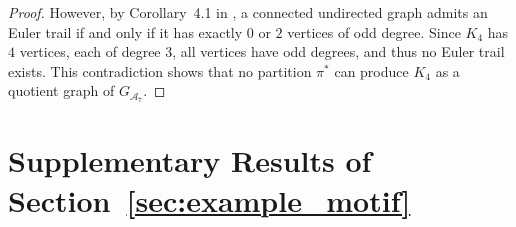 \documentclass[sn-mathphys, natbib=false]{sn-jnl}
\newcommand{\libref}[2]{\href{#2}{\texttt{#1}}}
\def\package{\libref{u-stats}{https://github.com/zrq1706/U-Statistics-Python}}
\theoremstyle{plain}
\theoremstyle{definition}
\def\Einsum{\textsc{Einsum}}
\newcommand{\completegraphp}[1]{K_{#1}}
\newcommand{\graphform}[1]{G_{#1}}
\newcommand{\Lin}[1]{{\color{purple}{#1}}}
\def\package{\libref{u-stats}{https://github.com/zrq1706/U-Statistics-Python}}
\def\calA{\mathcal{A}}
\def\calH{\mathcal{H}}
\begin{document}
\begin{bibunit}[agsm]
\begin{proof}
However, by Corollary~4.1 in \citet{bondy1976graph},  
a connected undirected graph admits an Euler trail if and only if it has exactly $0$ or $2$ vertices of odd degree.  
Since $\completegraphp{4}$ has $4$ vertices, each of degree $3$, all vertices have odd degrees, and thus no Euler trail exists.  
This contradiction shows that no partition $\pi^*$ can produce $\completegraphp{4}$ as a quotient graph of $\graphform{\calA_7}$.
\end{proof}







\section{Supplementary Results of Section~\ref{sec:example_motif}}
\label{app:motifs}


\end{bibunit}
\end{document}
